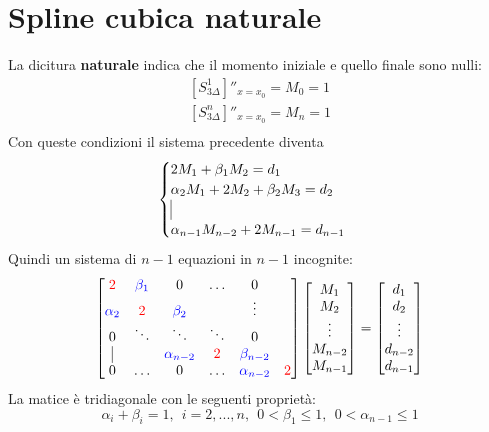 \documentclass[a4paper, portrait]{book}
\numberwithin{equation}{chapter} %
\begin{document}
\section{Spline cubica naturale}
La dicitura \textbf{naturale} indica che il momento iniziale e quello finale sono nulli:
\begin{gather}
    \left[S_{3\Delta}^1\right]''_{x=x_0} = M_0 = 1\\
    \left[S_{3\Delta}^n\right]''_{x=x_0} = M_n = 1\\
\end{gather}
Con queste condizioni il sistema precedente diventa
\begin{equation}
    \begin{cases}
        2M_1 + \beta_1M_2 = d_1\\
        \alpha_2M_1 + 2M_2 + \beta_2M_3 = d_2\\
        \vline\\
        \alpha_{n-1}M_{n-2}+2M_{n-1}=d_{n-1}
    \end{cases}
\end{equation}
Quindi un sistema di $n-1$ equazioni in $n-1$ incognite:
\begin{equation}
    \begin{bmatrix}
        {\color{red}{2}}&{\color{blue}{\beta_1}}&0&\dots&0\\
        {\color{blue}{\alpha_2}}&{\color{red}{2}}&{\color{blue}{\beta_2}}&&\vdots\\
        0&\ddots&\ddots&\ddots&0\\
        \vline&&{\color{blue}{\alpha_{n-2}}}&{\color{red}{2}}&{\color{blue}{\beta_{n-2}}}\\
        0&\dots&0&\dots&{\color{blue}{\alpha_{n-2}}}&{\color{red}{2}}
    \end{bmatrix}\begin{bmatrix}
        M_1\\M_2\\\vdots\\M_{n-2}\\M_{n-1}
    \end{bmatrix} = \begin{bmatrix}
        d_1\\d_2\\\vdots\\d_{n-2}\\d_{n-1}
    \end{bmatrix}
\end{equation}
La matice è tridiagonale con le seguenti proprietà:
$$\alpha_i + \beta_i = 1, \ \ i = 2,...,n, \ \ 0<\beta_1 \leq 1, \ \ 0 < \alpha_{n-1}\leq 1$$
\end{document}
